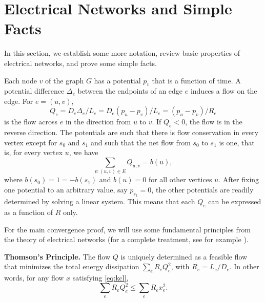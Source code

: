 \documentclass[11pt,a4paper]{article}
\renewcommand{\source}{\ensuremath{s_0}}
\renewcommand{\sink}{\ensuremath{s_1}}
\newcommand{\diverg}{b}
\begin{document}
\section{Electrical Networks and Simple Facts}\label{sec: preliminaries}

In this section, we establish some more notation, review basic properties of
electrical networks, and prove some simple facts. 

Each node $v$ of the graph $G$ has a potential $p_v$ that is a function of
time. A potential difference $\Delta_e$ between the endpoints
of an edge $e$ induces a flow on the edge. For $e = (u,v)$,   
\begin{equation}
\label{eq:ohm}
Q_e = D_e \Delta_e / L_e = D_e (p_u - p_v)/L_e  = (p_u - p_v)/R_e %
\end{equation}
is the flow across $e$ in the direction from $u$ to $v$. If $Q_e <0$, the flow
is in the reverse direction. The potentials are such that there is flow
conservation in every vertex except for $\source$ and $\sink$ and such that the net flow from $\source$ to $\sink$ is one, that is, for every vertex $u$, we have  
\begin{equation}
\label{eq:kcl}
   \sum_{v:(u,v) \in E} Q_{u,v}  = \diverg(u),   
\end{equation}
where $\diverg(\source) = 1 = - \diverg(\sink)$ and $\diverg(u) = 0$ for all other vertices $u$. After fixing one potential to an arbitrary value, say $p_{\sink} = 0$, the other potentials are readily determined by solving a linear system. This means that each $Q_e$ can be expressed as a function of $R$ only.  


For the main convergence proof, we will use some fundamental principles from
the theory of electrical networks (for a complete treatment, see for example \cite[Chapters II, IX]{Bollobas:1998}). \smallskip

\noindent
\textbf{Thomson's Principle.} The flow $Q$ is uniquely determined as a feasible flow that minimizes the total energy dissipation $\sum_e R_e Q^2_e$, with $R_e = L_e/D_e$. In other words, for any flow $x$ satisfying \eqref{eq:kcl}, 
\begin{equation}
\label{eq:thomson}
\sum_e R_e Q_e^2 \le \sum_e R_e x_e^2. 
\end{equation}\smallskip
\end{document}
